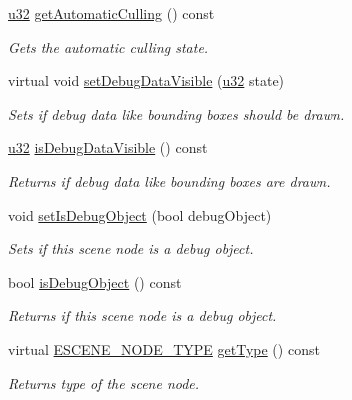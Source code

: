 \begin{DoxyCompactItemize}
\hyperlink{namespaceirr_a0416a53257075833e7002efd0a18e804}{u32} \hyperlink{classirr_1_1scene_1_1ISceneNode_a494c159287ab022d0f797642bf41476e}{get\+Automatic\+Culling} () const 
\begin{DoxyCompactList}\small\item\em Gets the automatic culling state. \end{DoxyCompactList}\item 
virtual void \hyperlink{classirr_1_1scene_1_1ISceneNode_ad83877ca84fa9cde95f099f961e80577}{set\+Debug\+Data\+Visible} (\hyperlink{namespaceirr_a0416a53257075833e7002efd0a18e804}{u32} state)
\begin{DoxyCompactList}\small\item\em Sets if debug data like bounding boxes should be drawn. \end{DoxyCompactList}\item 
\hyperlink{namespaceirr_a0416a53257075833e7002efd0a18e804}{u32} \hyperlink{classirr_1_1scene_1_1ISceneNode_a29224344555fef716b7c466b54349e65}{is\+Debug\+Data\+Visible} () const 
\begin{DoxyCompactList}\small\item\em Returns if debug data like bounding boxes are drawn. \end{DoxyCompactList}\item 
void \hyperlink{classirr_1_1scene_1_1ISceneNode_a7ceda3eb747a353ffeda02c26e697cbd}{set\+Is\+Debug\+Object} (bool debug\+Object)
\begin{DoxyCompactList}\small\item\em Sets if this scene node is a debug object. \end{DoxyCompactList}\item 
bool \hyperlink{classirr_1_1scene_1_1ISceneNode_aaf7667d0fec6953461237e8e11c0ceb3}{is\+Debug\+Object} () const 
\begin{DoxyCompactList}\small\item\em Returns if this scene node is a debug object. \end{DoxyCompactList}\item 
virtual \hyperlink{namespaceirr_1_1scene_acad3d7ef92a9807d391ba29120f3b7bd}{E\+S\+C\+E\+N\+E\+\_\+\+N\+O\+D\+E\+\_\+\+T\+Y\+PE} \hyperlink{classirr_1_1scene_1_1ISceneNode_acb294abaf64a85e11744cce96f99926e}{get\+Type} () const 
\begin{DoxyCompactList}\small\item\em Returns type of the scene node. \end{DoxyCompactList}\item 

\end{DoxyCompactItemize}
